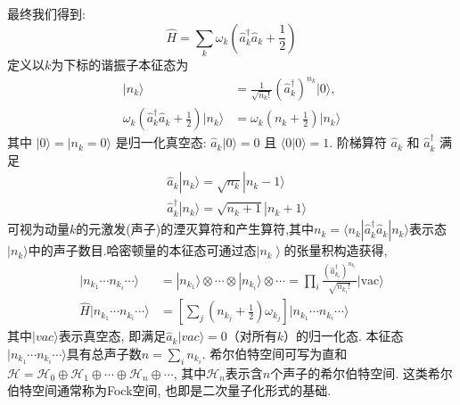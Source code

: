 最终我们得到:
\begin{equation}
	\hat{H}=\sum_k\omega_k\left(\hat{a}_k^\dagger\hat{a}_k+\frac{1}{2}\right)
\end{equation}
定义以$ k $为下标的谐振子本征态为
\begin{equation}
	\begin{aligned}|n_k\rangle&=\frac{1}{\sqrt{n_k!}}\left(\hat{a}_k^\dagger\right)^{n_k}|0\rangle,\\\omega_k\left(\hat{a}_k^\dagger\hat{a}_k+\frac{1}{2}\right)|n_k\rangle&=\omega_k\left(n_k+\frac{1}{2}\right)|n_k\rangle\end{aligned}
\end{equation}
其中 $|0\rangle=|n_k=0\rangle$ 是归一化真空态: $\hat{a}_k|0\rangle=0$ 且 $\langle0|0\rangle=1$. 阶梯算符 $\hat{a}_k$ 和 $\hat{a}_k^\dagger$ 满足
\begin{equation}
	\begin{aligned}&\hat{a}_k|n_k\rangle=\sqrt{n_k}|n_k-1\rangle\\&\hat{a}_k^\dagger|n_k\rangle=\sqrt{n_k+1}|n_k+1\rangle\end{aligned}
\end{equation}
可视为动量$k$的元激发(声子)的湮灭算符和产生算符,其中$n_k=\langle n_k|\hat{a}_k^\dagger\hat{a}_k|n_k\rangle$表示态$|n_k\rangle$中的声子数目.哈密顿量的本征态可通过态$\left|n_k\right\rangle$的张量积构造获得,
\begin{equation}
	\begin{aligned}|n_{k_1}\cdots n_{k_i}\cdots\rangle&=|n_{k_1}\rangle\otimes\cdots\otimes|n_{k_i}\rangle\otimes\cdots=\prod_i\frac{\left(\hat{a}_{k_i}^\dagger\right)^{n_{k_i}}}{\sqrt{n_{k_i}!}}|\mathrm{vac}\rangle\\\hat{H}|n_{k_1}\cdots n_{k_i}\cdots\rangle&=\left[\sum_j\left(n_{k_j}+\frac{1}{2}\right)\omega_{k_j}\right]|n_{k_1}\cdots n_{k_i}\cdots\rangle\end{aligned}
\end{equation}
其中$|vac\rangle$表示真空态, 即满足$\hat{a}_k|vac\rangle=0$（对所有$k$）的归一化态. 本征态$|n_{k_1}\cdots n_{k_i}\cdots\rangle$具有总声子数$n=\sum_i n_{k_i}$. 希尔伯特空间可写为直和$\mathcal{H}=\mathcal{H}_0\oplus\mathcal{H}_1\oplus\cdots\oplus\mathcal{H}_n\oplus\cdots$, 其中$\mathcal{H}_n$表示含$n$个声子的希尔伯特空间. 这类希尔伯特空间通常称为Fock空间, 也即是二次量子化形式的基础.

